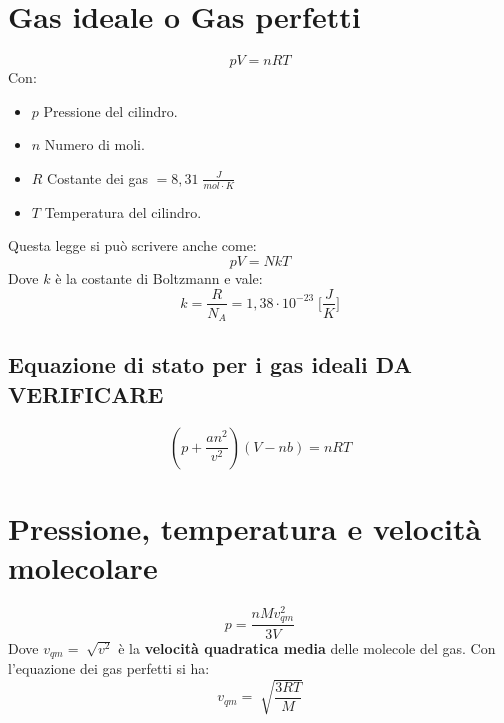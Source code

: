     \section*{Gas ideale o Gas perfetti} 
        \begin{equation*}
            pV = nRT
        \end{equation*}
    Con:
        \begin{itemize}
            \item $p$ Pressione del cilindro.
            \item $n$ Numero di moli.
            \item $R$ Costante dei gas $= 8,31 \; \frac{J}{mol \cdot K}$
            \item $T$ Temperatura del cilindro.
        \end{itemize}
    Questa legge si può scrivere anche come:
        \begin{equation*}
            pV = NkT
        \end{equation*}
    Dove $k$ è la costante di Boltzmann e vale:
        \begin{equation*}
            k = \frac{R}{N_A} = 1,38 \cdot 10^{-23} \; \Bigg[\frac{J}{K}\Bigg]
        \end{equation*}
        \subsection*{Equazione di stato per i gas ideali DA VERIFICARE}
            \begin{equation*}
                (p + \frac{an^2}{v^2})(V - nb) = nRT
            \end{equation*}

    \section*{Pressione, temperatura e velocità molecolare}
            \begin{equation*}
                p = \frac{nMv^2_{qm}}{3V}
            \end{equation*}
    Dove $v_{qm} = \sqrt[]{v^2}$ è la \textbf{velocità quadratica media} delle
    molecole del gas. Con l'equazione dei gas perfetti si ha:
            \begin{equation*}
                v_{qm} = \sqrt[]{\frac{3RT}{M}}
            \end{equation*}